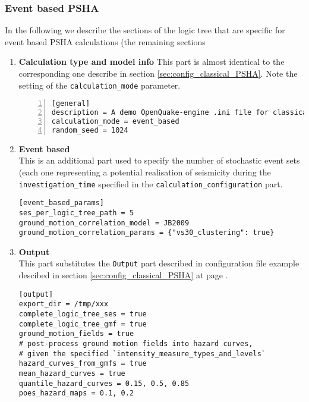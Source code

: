 \subsubsection{Event based PSHA}
%
In the following we describe the sections of the logic tree that are 
specific for event based PSHA calculations (the remaining sections 
\begin{enumerate}
\item \textbf{Calculation type and model info}
    This part is almost identical to the corresponding one 
    describe in section \ref{sec:config_classical_PSHA}. Note
    the setting of the \texttt{calculation\_mode} parameter.
\begin{Verbatim}[frame=single, commandchars=\\\{\}, fontsize=\small,
    numbers=left, numbersep=2pt]
[general]
description = A demo OpenQuake-engine .ini file for classical PSHA
calculation_mode = event_based
random_seed = 1024
\end{Verbatim}
%
\item \textbf{Event based} \hfill \\
This is an additional part used to specify the number of stochastic 
event sets (each one representing a potential realisation of seismicity
during the \texttt{investigation\_time} specified in the 
\texttt{calculation\_configuration} part.
\begin{Verbatim}[frame=single, commandchars=\\\{\}, fontsize=\small]
[event_based_params]
ses_per_logic_tree_path = 5
ground_motion_correlation_model = JB2009
ground_motion_correlation_params = {"vs30_clustering": true}
\end{Verbatim}
%
\item \textbf{Output} \hfill \\
This part substitutes the \texttt{Output} part described in 
configuration file example descibed in section \ref{sec:config_classical_PSHA}
at page \pageref{sec:config_classical_PSHA}.
\begin{Verbatim}[frame=single, commandchars=\\\{\}, fontsize=\small]
[output]
export_dir = /tmp/xxx
complete_logic_tree_ses = true
complete_logic_tree_gmf = true
ground_motion_fields = true
# post-process ground motion fields into hazard curves,
# given the specified `intensity_measure_types_and_levels`
hazard_curves_from_gmfs = true
mean_hazard_curves = true
quantile_hazard_curves = 0.15, 0.5, 0.85
poes_hazard_maps = 0.1, 0.2
\end{Verbatim}
%
\end{enumerate}
